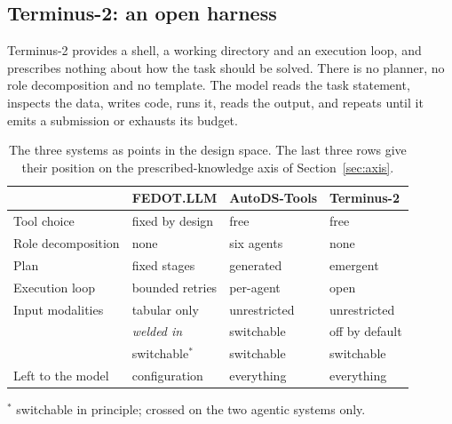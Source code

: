 \subsection{Terminus-2: an open harness}

Terminus-2 provides a shell, a working directory and an execution loop, and
prescribes nothing about how the task should be solved. There is no planner, no
role decomposition and no template. The model reads the task statement, inspects
the data, writes code, runs it, reads the output, and repeats until it emits a
submission or exhausts its budget.

\begin{table}[t]
\centering
\caption{The three systems as points in the design space. The last three rows give their position on the prescribed-knowledge axis of Section~\ref{sec:axis}.}
\label{tab:designpoints}
\small
\begin{tabular}{llll}
\toprule
 & FEDOT.LLM & AutoDS-Tools & Terminus-2 \\
\midrule
Tool choice        & fixed by design & free            & free \\
Role decomposition & none            & six agents      & none \\
Plan               & fixed stages    & generated       & emergent \\
Execution loop     & bounded retries & per-agent       & open \\
Input modalities   & tabular only    & unrestricted    & unrestricted \\
\midrule
\Ktool{}           & \emph{welded in} & switchable     & off by default \\
\Kdisc{}           & switchable$^{\ast}$ & switchable      & switchable \\
Left to the model  & configuration   & everything      & everything \\
\bottomrule
\end{tabular}
\par\smallskip
\begin{minipage}{0.95\linewidth}\footnotesize $^{\ast}$ switchable in principle;
crossed on the two agentic systems only.\end{minipage}
\end{table}



